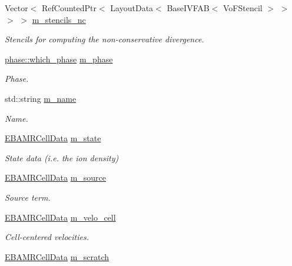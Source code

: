 \begin{DoxyCompactItemize}
Vector$<$ Ref\+Counted\+Ptr$<$ Layout\+Data$<$ Base\+I\+V\+F\+AB$<$ Vo\+F\+Stencil $>$ $>$ $>$ $>$ \hyperlink{classcdr__solver_ab4825a310de1071036eb9a94d08912fe}{m\+\_\+stencils\+\_\+nc}
\begin{DoxyCompactList}\small\item\em Stencils for computing the non-\/conservative divergence. \end{DoxyCompactList}\item 
\hyperlink{namespacephase_a23c76f548a5eb1955ed8c929c541108b}{phase\+::which\+\_\+phase} \hyperlink{classcdr__solver_aac456cdaeac23bf19505abcfb1515963}{m\+\_\+phase}
\begin{DoxyCompactList}\small\item\em Phase. \end{DoxyCompactList}\item 
std\+::string \hyperlink{classcdr__solver_a2c1f204e0a67df5865f78166e3a4ed6b}{m\+\_\+name}
\begin{DoxyCompactList}\small\item\em Name. \end{DoxyCompactList}\item 
\hyperlink{type__definitions_8H_a7e610f301989e5e07781c5e338bdb7c3}{E\+B\+A\+M\+R\+Cell\+Data} \hyperlink{classcdr__solver_a9cac7fee8e4da4e39079bfd9e04c8dd8}{m\+\_\+state}
\begin{DoxyCompactList}\small\item\em State data (i.\+e. the ion density) \end{DoxyCompactList}\item 
\hyperlink{type__definitions_8H_a7e610f301989e5e07781c5e338bdb7c3}{E\+B\+A\+M\+R\+Cell\+Data} \hyperlink{classcdr__solver_a970e1cd699f3a9e47f4ba3eb3775bc8e}{m\+\_\+source}
\begin{DoxyCompactList}\small\item\em Source term. \end{DoxyCompactList}\item 
\hyperlink{type__definitions_8H_a7e610f301989e5e07781c5e338bdb7c3}{E\+B\+A\+M\+R\+Cell\+Data} \hyperlink{classcdr__solver_ac7b5cb0f8b28333fc15fbe0852432c14}{m\+\_\+velo\+\_\+cell}
\begin{DoxyCompactList}\small\item\em Cell-\/centered velocities. \end{DoxyCompactList}\item 
\hyperlink{type__definitions_8H_a7e610f301989e5e07781c5e338bdb7c3}{E\+B\+A\+M\+R\+Cell\+Data} \hyperlink{classcdr__solver_ac816720ca6b0e21b719044c1a9b70f92}{m\+\_\+scratch}

\end{DoxyCompactItemize}
